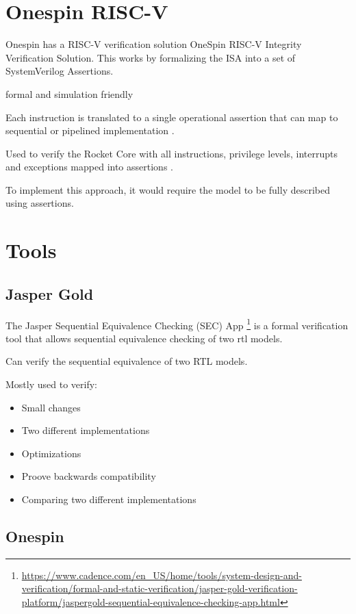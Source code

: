 \section{Onespin RISC-V}

Onespin has a RISC-V verification solution OneSpin RISC-V Integrity Verification Solution. \cite{onespinsolutionsAssuringIntegrityRISCV2019} 
This works by formalizing the ISA into a set of SystemVerilog Assertions.

formal and simulation friendly

Each instruction is translated to a single operational assertion that can map to sequential or pipelined implementation \cite{onespinsolutionsAssuringIntegrityRISCV2019}.

Used to verify the Rocket Core with all instructions, privilege levels, interrupts and exceptions mapped into assertions \cite{onespinsolutionsAssuringIntegrityRISCV2019}.

To implement this approach, it would require the model to be fully described using assertions.

\section{Tools}

\subsection{Jasper Gold}
The Jasper Sequential Equivalence Checking (SEC) App \footnote{\url{https://www.cadence.com/en_US/home/tools/system-design-and-verification/formal-and-static-verification/jasper-gold-verification-platform/jaspergold-sequential-equivalence-checking-app.html}}
is a formal verification tool that allows sequential equivalence checking of two \acrshort{rtl} models.

Can verify the sequential equivalence of two RTL models.

Mostly used to verify:
\begin{itemize}
    \item Small changes
    \item Two different implementations
    \item Optimizations
    \item Proove backwards compatibility
    \item Comparing two different implementations
\end{itemize}

\subsection{Onespin}

